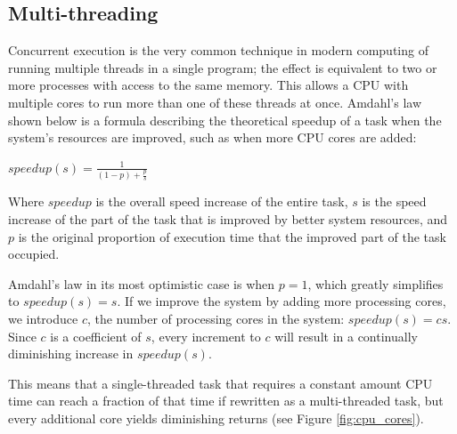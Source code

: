 \documentclass[11pt, a4paper, twocolumn]{article}
\begin{document}
\subsection{Multi-threading}

Concurrent execution is the very common technique in modern computing of running multiple threads in a single program; the effect is equivalent to two or more processes with access to the same memory. This allows a CPU with multiple cores to run more than one of these threads at once. Amdahl's law \citep{Rodgers1985} shown below is a formula describing the theoretical speedup of a task when the system's resources are improved, such as when more CPU cores are added:

\begin{center}
\begin{Large}
$speedup(s) = \frac{1}{(1-p)+\frac{p}{s}}$
\end{Large}
\end{center}

Where $speedup$ is the overall speed increase of the entire task, $s$ is the speed increase of the part of the task that is improved by better system resources, and $p$ is the original proportion of execution time that the improved part of the task occupied. %

Amdahl's law in its most optimistic case is when $p = 1$, which greatly simplifies to $speedup(s) = s$. If we improve the system by adding more processing cores, we introduce $c$, the number of processing cores in the system: $speedup(s) = cs$. Since $c$ is a coefficient of $s$, every increment to $c$ will result in a continually diminishing increase in $speedup(s)$.

This means that a single-threaded task that requires a constant amount CPU time can reach a fraction of that time if rewritten as a multi-threaded task, but every additional core yields diminishing returns (see Figure \ref{fig:cpu_cores}).
\end{document}
